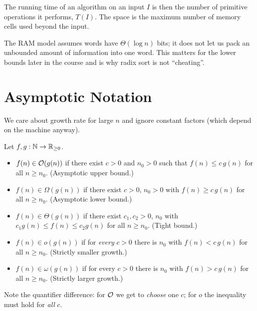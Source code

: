 The running time of an algorithm on an input $I$ is then the number of primitive
operations it performs, $T(I)$. The space is the maximum number of memory cells
used beyond the input.

\begin{remark}
The RAM model assumes words have $\Theta(\log n)$ bits; it does not let us pack an
unbounded amount of information into one word. This matters for the lower bounds
later in the course and is why radix sort is not ``cheating''.
\end{remark}

\section{Asymptotic Notation}

We care about growth rate for large $n$ and ignore constant factors (which depend
on the machine anyway).

\begin{definition}
Let $f, g : \mathbb{N} \to \mathbb{R}_{\ge 0}$.
\begin{itemize}
  \item $f(n) \in \mathcal{O}(g(n))$ if there exist $c > 0$ and $n_0 > 0$ such that
        $f(n) \le c\, g(n)$ for all $n \ge n_0$. (Asymptotic upper bound.)
  \item $f(n) \in \Omega(g(n))$ if there exist $c > 0$, $n_0 > 0$ with
        $f(n) \ge c\, g(n)$ for all $n \ge n_0$. (Asymptotic lower bound.)
  \item $f(n) \in \Theta(g(n))$ if there exist $c_1, c_2 > 0$, $n_0$ with
        $c_1 g(n) \le f(n) \le c_2 g(n)$ for all $n \ge n_0$. (Tight bound.)
  \item $f(n) \in o(g(n))$ if for \emph{every} $c > 0$ there is $n_0$ with
        $f(n) < c\, g(n)$ for all $n \ge n_0$. (Strictly smaller growth.)
  \item $f(n) \in \omega(g(n))$ if for every $c > 0$ there is $n_0$ with
        $f(n) > c\, g(n)$ for all $n \ge n_0$. (Strictly larger growth.)
\end{itemize}
\end{definition}

Note the quantifier difference: for $\mathcal{O}$ we get to \emph{choose} one $c$; for
$o$ the inequality must hold for \emph{all} $c$.

